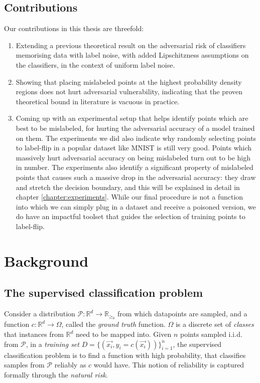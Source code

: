 \documentclass{ociamthesis}
\begin{document}
\section{Contributions}
Our contributions in this thesis are threefold:
\begin{enumerate}
    \item Extending a previous theoretical result on the adversarial risk of
    classifiers memorising data with label noise, with added Lipschitzness
    assumptions on the classifiers, in the context of uniform label noise.
    \item Showing that placing mislabeled points at the highest probability
    density regions does not hurt adversarial vulnerability, indicating that the
    proven theoretical bound in literature is vacuous in practice.
    \item Coming up with an experimental setup that helps identify points which
    are best to be mislabeled, for hurting the adversarial accuracy of a model
    trained on them. The experiments we did also indicate why randomly selecting
    points to label-flip in a popular dataset like MNIST is still very good.
    Points which massively hurt adversarial accuracy on being mislabeled turn
    out to be high in number. The experiments also identify a significant
    property of mislabeled points that causes such a massive drop in the
    adversarial accuracy: they draw and stretch the decision boundary, and this
    will be explained in detail in chapter \ref{chapter:experiments}. While our
    final procedure is not a function into which we can simply plug in a dataset
    and receive a poisoned version, we do have an impactful toolset that guides
    the selection of training points to label-flip.
\end{enumerate}


\chapter{Background}
\section{The supervised classification problem}

Consider a distribution $\mathcal{P}: \mathbb{R}^d \to \mathbb{R}_{\geq_0}$ from
which datapoints are sampled, and a function $c: \mathbb{R}^d \to \Omega$,
called the \emph{ground truth} function. $\Omega$ is a discrete set of
\emph{classes} that instances from $\mathbb{R}^d$ need to be mapped into. Given
$n$ points sampled i.i.d. from $\mathcal{P}$, in a \emph{training set}
$D=\{(\vec{x_i}, y_i=c(\vec{x_i}))\}_{i=1}^{n}$, the supervised classification
problem is to find a function with high probability, that classifies samples
from $\mathcal{P}$ reliably as $c$ would have. This notion of reliability is
captured formally through the \emph{natural risk}.
\end{document}
